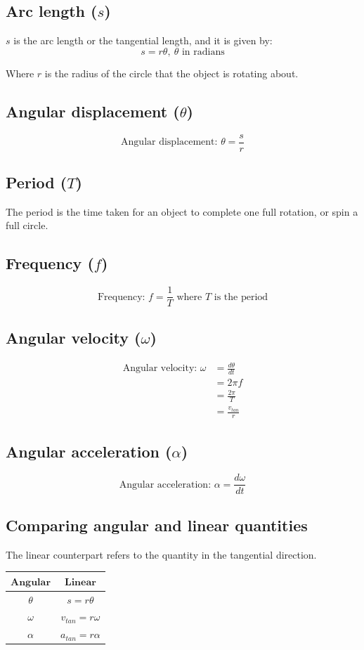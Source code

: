 \documentclass[11pt]{article}
\begin{document}
\subsection{Arc length (\(s\))}
\label{sec:org6b7b79f}
\(s\) is the arc length or the tangential length, and it is given by:
\[s = r \theta, \ \theta \text{ in radians}\]

Where \(r\) is the radius of the circle that the object is rotating about.
\subsection{Angular displacement (\(\theta\))}
\label{sec:org12b2afb}
\[\text{Angular displacement: } \theta = \frac{s}{r}\]
\subsection{Period (\(T\))}
\label{sec:orgea72d31}
The period is the time taken for an object to complete one full rotation, or spin a full circle.
\subsection{Frequency (\(f\))}
\label{sec:orgcfcbcd9}
\[\text{Frequency: } f = \frac{1}{T} \text{ where } T \text{ is the period}\]
\subsection{Angular velocity (\(\omega\))}
\label{sec:orgd322c64}
\begin{align*}
\text{Angular velocity: } \omega &= \frac{d \theta}{dt} \\
&= 2 \pi f \\
&= \frac{2 \pi}{T} \\
&= \frac{v_{tan}}{r}
\end{align*}
\subsection{Angular acceleration (\(\alpha\))}
\label{sec:org26d6200}
\[\text{Angular acceleration: } \alpha = \frac{d \omega}{dt}\]
\subsection{Comparing angular and linear quantities}
\label{sec:orge465e65}
The linear counterpart refers to the quantity in the tangential direction.

\begin{center}
\begin{tabular}{ c|c }
\(\textbf{Angular}\) & \(\textbf{Linear}\) \\
\hline
\(\theta\) & \(s = r\theta\) \\
\(\omega\) & \(v_{tan} = r\omega\) \\
\(\alpha\) & \(a_{tan} = r\alpha\) \\
\end{tabular}
\end{center}
\end{document}
